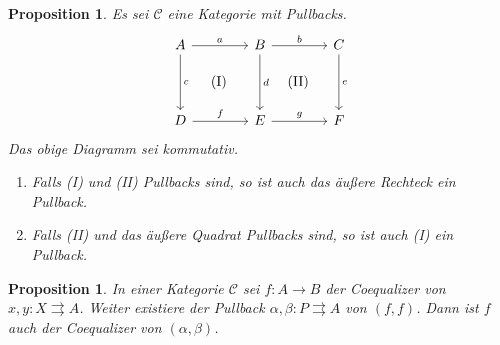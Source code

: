 \documentclass[a4paper, parskip=half]{scrartcl}
\theoremstyle{marginbreak}
\newtheorem{proposition}[remark]{Proposition}
\theoremstyle{nonumberplain}
\newtheorem{proof}{Beweis.}
\newcommand\cat\mathcal
\newcommand{\p}[1]{\iftoggle{proofs}{#1}{}}
\begin{document}
		\begin{proposition}\label{2-5-9}
			Es sei $\cat{C}$ eine Kategorie mit Pullbacks.
			\[
				\begin{tikzcd}[sep=4em]
					A \ar{r}{a} \ar[phantom]{dr}{\text{(I)}} \ar{d}{c} & B \ar[phantom]{dr}{\text{(II)}} \ar{r}{b} \ar{d}{d} & C \ar{d}{e}\\
					D \ar{r}{f} & E \ar{r}{g} & F
				\end{tikzcd}
			\]
			Das obige Diagramm sei kommutativ.
			\begin{enumerate}
				\item Falls (I) und (II) Pullbacks sind, so ist auch das äußere
					Rechteck ein Pullback.
				\item Falls (II) und das äußere Quadrat Pullbacks sind, so ist auch
					(I) ein Pullback.
			\end{enumerate}
		\end{proposition}
		\p{\begin{proof}
			\begin{enumerate}
				\item Es seien $x\colon X\to D$, $y\colon X\to C$ mit $g\circ f\circ x = e\circ y$.
					Pullback (II) liefert ein eindeutiges $z\colon X\to B$, sodass
					$b\circ z = y$, $d\circ z = f\circ x$. Letztere Gleichheit und Pullback
					(I) geben ein eindeutiges $w\colon X\to A$, sodass $a\circ w = z$, $c\circ w = x$.
					Insbesondere gilt $b\circ a\circ w = b\circ z = y$. Es sei $w'\colon X\to A$ ein
					weiterer Morphismus mit $b\circ a\circ w' = y$ und $c\circ w' = x$. Es gilt also
					$b\circ (a\circ w') = y = b\circ (a\circ w)$ und
					$d\circ(a\circ w') = f\circ (c\circ w') = f\circ x = f\circ c\circ w = d\circ (a\circ w)$.
					Pullback (II) liefert $a\circ w'=a\circ w$. Weiter ist $c\circ w'= x = c\circ w$.
					Pullback (I) liefert $w=w'$.
				\item Es sei $(A', c', a')$ der Pullback von $f$ und $d$. Mit (1) und da (II) ein Pullback ist, ist $(A', c', b\circ a')$ ein Pullback von
					$(g\circ f, e)$. Es ist jedoch auch $(A, c, b\circ a)$ ein Pullback von $(g\circ f, e)$.
					Da Limiten eindeutig sind, folgt $A\cong A'$. \textcolor{red}{Reicht das? Borceux
					schreibt den Isomophismus noch hin, aber ich glaube, das hier zeigt schon die
					Behauptung.}
			\end{enumerate}
		\end{proof}}
		\begin{proposition}
			In einer Kategorie $\cat{C}$ sei $f\colon A\to B$ der Coequalizer von
			$x, y\colon X\rightrightarrows A$. Weiter existiere der Pullback
			$\alpha, \beta\colon P\rightrightarrows A$ von $(f, f)$. Dann ist
			$f$ auch der Coequalizer von $(\alpha, \beta)$.
		\end{proposition}
\end{document}
